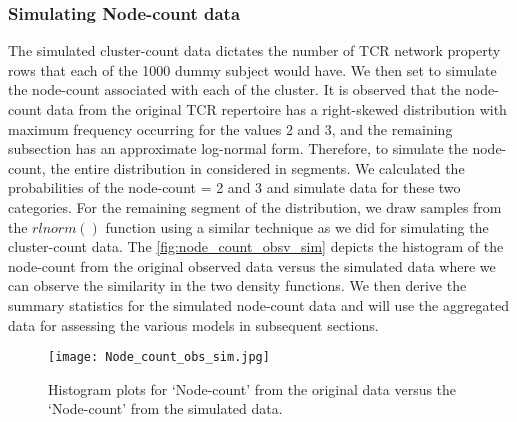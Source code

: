 \subsubsection{Simulating Node-count data}\label{subsubsec:sim_node_cnt}
The simulated cluster-count data dictates the number of TCR network property rows that each of the 1000 dummy subject would have. We then set to simulate the node-count associated with each of the cluster. It is observed that the node-count data from the original TCR repertoire has a right-skewed distribution with maximum frequency occurring for the values 2 and 3, and the remaining subsection has an approximate log-normal form. Therefore, to simulate the node-count, the entire distribution in considered in segments. We calculated the probabilities of the node-count = 2 and 3 and simulate data for these two categories. For the remaining segment of the distribution, we draw samples from the $rlnorm()$ function using a similar technique as we did for simulating the cluster-count data. The \autoref{fig:node_count_obsv_sim} depicts the histogram of the node-count from the original observed data versus the simulated data where we can observe the similarity in the two density functions. We then derive the summary statistics for the simulated node-count data and will use the aggregated data for assessing the various models in subsequent sections.\par
\begin{figure}[H]
\centering
\texttt{[image: Node\_count\_obs\_sim.jpg]}
\caption{Histogram plots for \lq Node-count' from the original data versus the \lq Node-count' from the simulated data.}
\label{fig:node_count_obsv_sim}
\end{figure}


